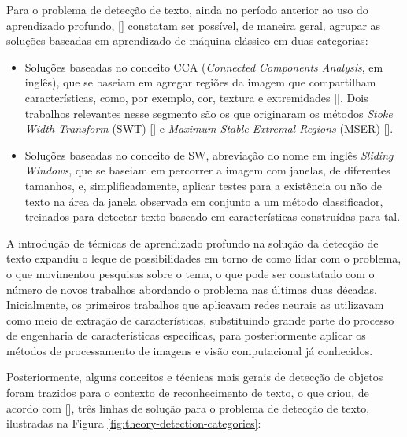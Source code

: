 Para o problema de detecção de texto, ainda no período anterior ao uso do aprendizado profundo, [] constatam ser 
possível, de maneira geral, agrupar as soluções baseadas em aprendizado de máquina clássico em duas categorias:

\begin{itemize}
    \item Soluções baseadas no conceito CCA (\textit{Connected Components Analysis}, em inglês), que se baseiam em agregar regiões da imagem que 
    compartilham características, como, por exemplo, cor, textura e extremidades []. Dois trabalhos relevantes 
    nesse segmento são os que originaram os métodos \textit{Stoke Width Transform} (SWT) [] e \textit{Maximum Stable Extremal Regions} 
    (MSER) [].

    \item Soluções baseadas no conceito de SW, abreviação do nome em inglês \textit{Sliding Windows}, que se baseiam em percorrer a imagem com janelas, 
    de diferentes tamanhos, e, simplificadamente, aplicar testes para a existência ou não de texto na área da janela observada em conjunto a um método 
    classificador, treinados para detectar texto baseado em características construídas para tal.
\end{itemize}

A introdução de técnicas de aprendizado profundo na solução da detecção de texto expandiu o leque de possibilidades em torno de como lidar com o problema, 
o que movimentou pesquisas sobre o tema, o que pode ser constatado com o número de novos trabalhos abordando o problema nas últimas duas décadas.
Inicialmente, os primeiros trabalhos que aplicavam redes neurais as utilizavam como meio de extração de características, substituindo grande parte do 
processo de engenharia de características específicas, para posteriormente aplicar os métodos de processamento de imagens e visão computacional já conhecidos.

Posteriormente, alguns conceitos e técnicas mais gerais de detecção de objetos foram trazidos para o contexto de reconhecimento de texto, o que criou, 
de acordo com [], três linhas de solução para o problema de detecção de texto, ilustradas na Figura \ref{fig:theory-detection-categories}:

